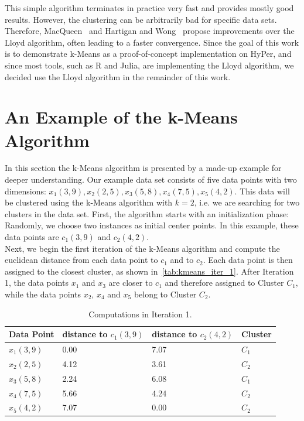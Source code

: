This simple algorithm terminates in practice very fast and provides mostly good results. However, the clustering can be arbitrarily bad for specific data sets. Therefore, MacQueen~\parencite{macqueen1967some} and Hartigan and Wong~\parencite{hartigan1979algorithm} propose improvements over the Lloyd algorithm, often leading to a faster convergence. Since the goal of this work is to demonstrate k-Means as a proof-of-concept implementation on HyPer, and since most tools, such as R and Julia, are implementing the Lloyd algorithm, we decided use the Lloyd algorithm in the remainder of this work. 

\section{An Example of the k-Means Algorithm}

In this section the k-Means algorithm is presented by a made-up example for deeper understanding. Our example data set consists of five data points with two dimensions: $x_1(3,9), x_2(2,5), x_3(5,8), x_4(7,5), x_5(4,2)$. This data will be clustered using the k-Means algorithm with $k = 2$, i.e. we are searching for two clusters in the data set. First, the algorithm starts with an initialization phase: Randomly, we choose two instances as initial center points. In this example, these data points are $c_1(3,9)$ and $c_2(4,2)$. 
\\
Next, we begin the first iteration of the k-Means algorithm and compute the euclidean distance from each data point to $c_1$ and to $c_2$. Each data point is then assigned to the closest cluster, as shown in~\autoref{tab:kmeans_iter_1}. After Iteration 1, the data points $x_1$ and $x_3$ are closer to $c_1$ and therefore assigned to Cluster $C_1$, while the data points $x_2$, $x_4$ and $x_5$ belong to Cluster $C_2$.

\begin{table}[htsb]
\caption[Computations in Iteration 1]{Computations in Iteration 1.}\label{tab:kmeans_iter_1}
\centering
\begin{tabular}{l l l l}
\toprule
  Data Point & distance to $c_1(3,9)$ & distance to $c_2(4,2)$ & Cluster \\
\midrule
    $x_1(3,9)$ & 0.00 & 7.07 & $C_1$ \\
    $x_2(2,5)$ & 4.12 & 3.61 & $C_2$ \\
    $x_3(5,8)$ & 2.24 & 6.08 & $C_1$ \\
    $x_4(7,5)$ & 5.66 & 4.24 & $C_2$ \\
    $x_5(4,2)$ & 7.07 & 0.00 & $C_2$ \\
\bottomrule
\end{tabular}
\end{table}


